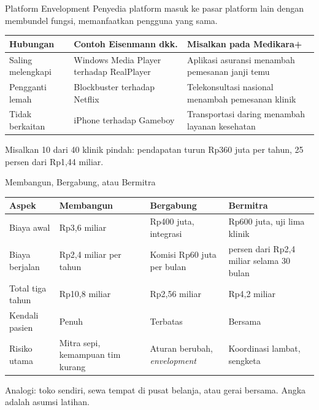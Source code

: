 \documentclass[aspectratio=169, table, 12pt]{beamer}
\begin{document}
\begin{frame}{{\Large Platform Envelopment}}
  \footnotesize
  Penyedia platform masuk ke pasar platform lain dengan membundel fungsi, memanfaatkan pengguna yang sama.

  \vspace{6pt}
  \begin{tabularx}{\textwidth}{>{\raggedright\arraybackslash}p{2.9cm}
      >{\raggedright\arraybackslash}p{4.3cm} >{\raggedright\arraybackslash}X}
    \hline
    \textbf{Hubungan} & \textbf{Contoh Eisenmann dkk.} & \textbf{Misalkan pada Medikara+} \\ \hline
    Saling melengkapi & Windows Media Player terhadap RealPlayer & Aplikasi asuransi menambah pemesanan janji temu \\ \hline
    Pengganti lemah & Blockbuster terhadap Netflix & Telekonsultasi nasional menambah pemesanan klinik \\ \hline
    Tidak berkaitan & iPhone terhadap Gameboy & Transportasi daring menambah layanan kesehatan \\ \hline
  \end{tabularx}

  \vspace{8pt}
  \small Misalkan 10 dari 40 klinik pindah: pendapatan turun Rp360 juta per tahun, 25 persen dari Rp1,44 miliar.
\end{frame}

\begin{frame}{{\Large Membangun, Bergabung, atau Bermitra}}
  \footnotesize
  \begin{tabularx}{\textwidth}{>{\raggedright\arraybackslash}p{2.6cm}
      >{\raggedright\arraybackslash}X >{\raggedright\arraybackslash}X >{\raggedright\arraybackslash}X}
    \hline
    \textbf{Aspek} & \textbf{Membangun} & \textbf{Bergabung} & \textbf{Bermitra} \\ \hline
    Biaya awal & Rp3,6 miliar & Rp400 juta, integrasi & Rp600 juta, uji lima klinik \\ \hline
    Biaya berjalan & Rp2,4 miliar per tahun & Komisi Rp60 juta per bulan & 60 persen dari Rp2,4 miliar selama 30 bulan \\ \hline
    Total tiga tahun & Rp10,8 miliar & Rp2,56 miliar & Rp4,2 miliar \\ \hline
    Kendali pasien & Penuh & Terbatas & Bersama \\ \hline
    Risiko utama & Mitra sepi, kemampuan tim kurang & Aturan berubah, \textit{envelopment} & Koordinasi lambat, sengketa \\ \hline
  \end{tabularx}

  \vspace{8pt}
  \small Analogi: toko sendiri, sewa tempat di pusat belanja, atau gerai bersama. Angka adalah asumsi latihan.
\end{frame}
\end{document}
